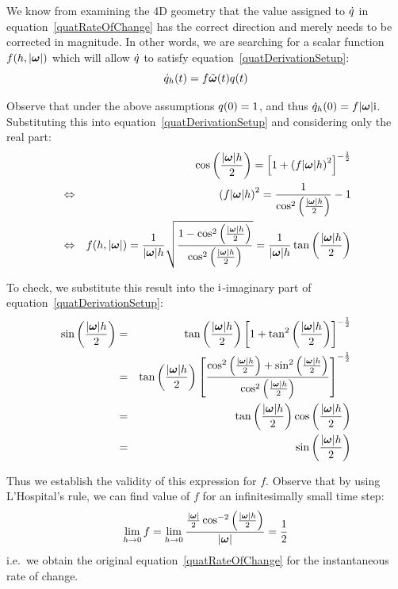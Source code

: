 We know from examining the 4D geometry that the value assigned to $\dot{q}$
in equation~\ref{quatRateOfChange} has the correct direction and merely needs to be
corrected in magnitude. In other words, we are searching for a scalar function
$f(h, \norm{\ve{\omega}})$ which will allow $\dot{q}$ to satisfy
equation~\ref{quatDerivationSetup}:
\begin{equation}
\dot{\q{q}}_h(t) = f\tilde{\ve{\omega}}(t)\q{q}(t)
\end{equation}

Observe that under the above assumptions $q(0) = 1$, and thus
$\dot{\q{q}}_h(0) = f \norm{\ve{\omega}} \qi$. Substituting this
into equation~\ref{quatDerivationSetup} and considering only the real part:
\begin{eqnarray*}
&& \cos\left(\frac{\norm{\ve{\omega}} h}{2}\right) =
    \left[1 + \left( f \norm{\ve{\omega}} h \right)^2 \right]^{-\frac{1}{2}} \\
&\Leftrightarrow&
    \left( f \norm{\ve{\omega}} h \right)^2 =
    \frac{1}{\cos^2\left(\frac{\norm{\ve{\omega}} h}{2}\right)} - 1 \\
&\Leftrightarrow&
    f(h, \norm{\ve{\omega}}) =
    \frac{1}{\norm{\ve{\omega}} h} \sqrt{\frac{
        1 - \cos^2\left(\frac{\norm{\ve{\omega}} h}{2}\right)}{
        \cos^2\left(\frac{\norm{\ve{\omega}} h}{2}\right)}} =
    \frac{1}{\norm{\ve{\omega}} h}
        \tan\left(\frac{\norm{\ve{\omega}} h}{2}\right)
\end{eqnarray*}

To check, we substitute this result into the $\mathrm{i}$-imaginary part of
equation~\ref{quatDerivationSetup}:
\begin{eqnarray*}
\sin\left(\frac{\norm{\ve{\omega}} h}{2}\right) & = &
    \tan\left(\frac{\norm{\ve{\omega}} h}{2}\right)
    \left[ 1 + \tan^2\left(\frac{\norm{\ve{\omega}} h}{2}\right)
    \right]^{-\frac{1}{2}} \\
&=& \tan\left(\frac{\norm{\ve{\omega}} h}{2}\right)
    \left[ \frac{\cos^2\left(\frac{\norm{\ve{\omega}} h}{2}\right) +
    \sin^2\left(\frac{\norm{\ve{\omega}} h}{2}\right) }{
    \cos^2\left(\frac{\norm{\ve{\omega}} h}{2}\right) }
    \right]^{-\frac{1}{2}} \\
&=& \tan\left(\frac{\norm{\ve{\omega}} h}{2}\right)
    \cos\left(\frac{\norm{\ve{\omega}} h}{2}\right) \\
&=& \sin\left(\frac{\norm{\ve{\omega}} h}{2}\right)
\end{eqnarray*}

Thus we establish the validity of this expression for $f$. Observe that by using 
L'Hospital's rule, we can find value of $f$ for an infinitesimally small time step:
$$
\lim_{h \to 0} f = \lim_{h \to 0} \frac{ \frac{\norm{\ve{\omega}}}{2}
    \cos^{-2}\left(\frac{\norm{\ve{\omega}} h}{2}\right) }{ \norm{\ve{\omega}} } =
    \frac{1}{2}
$$
i.e.\ we obtain the original equation~\ref{quatRateOfChange} for the
instantaneous rate of change.


